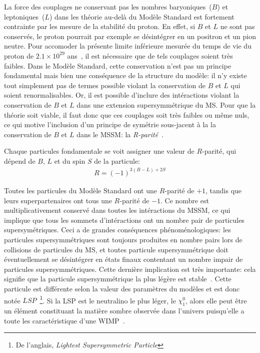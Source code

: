 La force des couplages ne conservant pas les nombres baryoniques~($B$)
et leptoniques~($L$) dans les théorie au-delà du Modèle Standard est
fortement contrainte par les mesure de la stabilité du proton. En
effet, si $B$ et $L$ ne sont pas conservés, le proton pourrait par
exemple se désintégrer en un positron et un pion neutre. Pour
accomoder la présente limite inférieure mesurée du temps de vie du
proton de $2.1 \times 10^{29}$
ans~\cite{kamland_collaboration_search_2006}, il est nécessaire que de
tels couplages soient très faibles.  Dans le Modèle Standard, cette
conservation n'est pas un principe fondamental mais bien une
conséquence de la structure du modèle: il n'y existe tout simplement
pas de termes possible violant la conservation de $B$ et $L$ qui soient
renormalisables. Or, il est possible d'inclure des intéractions
violant la conservation de $B$ et $L$ dans une extension
supersymmétrique du MS. Pour que la théorie soit viable, il faut donc
que ces couplages soit très faibles ou même nuls, ce qui motive
l'inclusion d'un principe de symétrie sous-jacent à la la
conservation de $B$ et $L$ dans le MSSM: la
\emph{R-parité}~\cite{martin_supersymmetry_1997}.

Chaque particules fondamentale se voit assigner une valeur de
$R$-parité, qui dépend de $B$, $L$ et du spin $S$ de la
particule:
\begin{eqnarray}
  R = (-1)^{3(B - L) + 2S}
\end{eqnarray}

Toutes les particules du Modèle Standard ont une $R$-parité de $+1$,
tandis que leurs superpartenaires ont tous une $R$-parité de $-1$. Ce
nombre est multiplicativement conservé dans toutes les intéractions du
MSSM, ce qui implique que tous les sommets d'intéractions ont un
nombre pair de particules supersymétriques. Ceci a de grandes
conséquences phénoménologiques: les particules supersymmétriques sont
toujours produites en nombre pairs lors de collisions de particules du
MS, et toutes particule supersymmétrique doit éventuellement se
désintégrer en états finaux contentant un nombre impair de particules
supersymmétriques. Cette dernière implication est très importante:
cela signifie que la particule supersymmétrique la plus légère est
stable~\cite{martin_supersymmetry_1997}. Cette particule est
différente selon la valeur des paramètres du modèles et est donc notée
$LSP$~\footnote{De l'anglais, \emph{Lightest Supersymmetric
    Particle}}. Si la LSP est le neutralino le plus léger, le
$\chi_1^0$, alors elle peut être un élément constituant la matière
sombre observée dans l'univers puisqu'elle a toute les caractéristique
d'une WIMP~\cite{olive_review_2014}.

